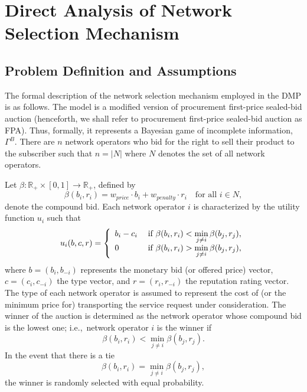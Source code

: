 \chapter{Direct Analysis of Network Selection Mechanism} %
\label{cha:direct}

\minitoc
\vspace{10mm}

\section{Problem Definition and Assumptions} %
\label{sec:problem_definition_and_assumptions_direct}
The formal description of the network selection mechanism employed in the DMP is as follows. The model is a modified version of procurement first-price sealed-bid auction (henceforth, we shall refer to procurement first-price sealed-bid auction as FPA). Thus, formally, it represents a Bayesian game of incomplete information, $\Gamma^B$. There are $n$ network operators who bid for the right to sell their product to the subscriber such that $n = |N|$ where $N$ denotes the set of all network operators.

Let $\beta : \mathbb{R}_+\times [0,1] \to \mathbb{R}_+$, defined by
\begin{equation}
	\label{eq:def_beta_direct}
	\beta(b_i, r_i) = w_{price}\cdot b_i + w_{penalty}\cdot r_i \quad\text{for all } i\in N,
\end{equation}
denote the compound bid. Each network operator $i$ is characterized by the utility function $u_i$ such that
\begin{equation}
	\label{eq:sellers_utility_direct}
	u_i(b,c,r) = \left\{
	\begin{array}{l l}
		b_i-c_i & \;\text{if } \beta(b_i, r_i) < \displaystyle\min_{j\neq i}\beta(b_j,r_j),\\
		0 & \;\text{if } \beta(b_i, r_i) > \displaystyle\min_{j\neq i}\beta(b_j,r_j),
	\end{array}\right.
\end{equation}
where $b = (b_i,b_{-i})$ represents the monetary bid (or offered price) vector, $c = (c_i, c_{-i})$ the type vector, and $r = (r_i, r_{-i})$ the reputation rating vector. The type of each network operator is assumed to represent the cost of (or the minimum price for) transporting the service request under consideration. The winner of the auction is determined as the network operator whose compound bid is the lowest one; i.e.,~network operator $i$ is the winner if
\begin{equation*}
	\beta(b_i, r_i) < \displaystyle\min_{j\neq i}\beta(b_j,r_j).
\end{equation*}
In the event that there is a tie
\begin{equation*}
	\beta(b_i, r_i) = \displaystyle\min_{j\neq i}\beta(b_j,r_j),
\end{equation*}
the winner is randomly selected with equal probability.

